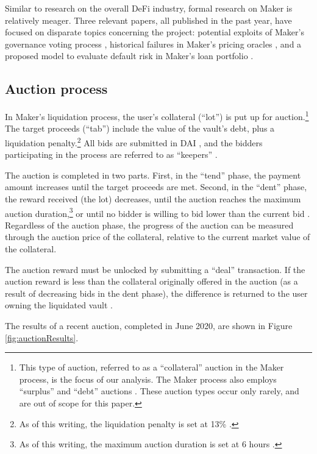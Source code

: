 \documentclass[conference]{IEEEtran}
\begin{document}
Similar to research on the overall DeFi industry, formal research on Maker is relatively meager. Three relevant papers, all published in the past year, have focused on disparate topics concerning the project: potential exploits of Maker's governance voting process \cite{exploit1}, historical failures in Maker's pricing oracles \cite{mkrGovernance}, and a proposed model to evaluate default risk in Maker's loan portfolio \cite{mkrCredit}.

\subsection{Auction process}
In Maker's liquidation process, the user's collateral (``lot'') is put up for auction.\footnote{This type of auction, referred to as a ``collateral'' auction in the Maker process, is the focus of our analysis. The Maker process also employs ``surplus'' and ``debt'' auctions \cite{makerAuctions}. These auction types occur only rarely, and are out of scope for this paper.} The target proceeds (``tab'') include the value of the vault's debt, plus a liquidation penalty.\footnote{As of this writing, the liquidation penalty is set at 13\% \cite{oasis}.} All bids are submitted in DAI \cite{flipper}, and the bidders participating in the process are referred to as ``keepers'' \cite{keepers}.

The auction is completed in two parts. First, in the ``tend'' phase, the payment amount increases until the target proceeds are met. Second, in the ``dent'' phase, the reward received (the lot) decreases, until the auction reaches the maximum auction duration,\footnote{As of this writing, the maximum auction duration is set at 6 hours \cite{daiAuctions}.} or until no bidder is willing to bid lower than the current bid \cite{flipper}. Regardless of the auction phase, the progress of the auction can be measured through the auction price of the collateral, relative to the current market value of the collateral. 

The auction reward must be unlocked by submitting a ``deal'' transaction. If the auction reward is less than the collateral originally offered in the auction (as a result of decreasing bids in the dent phase), the difference is returned to the user owning the liquidated vault \cite{flipper}.

The results of a recent auction, completed in June 2020, are shown in Figure \ref{fig:auctionResults}.
\end{document}
